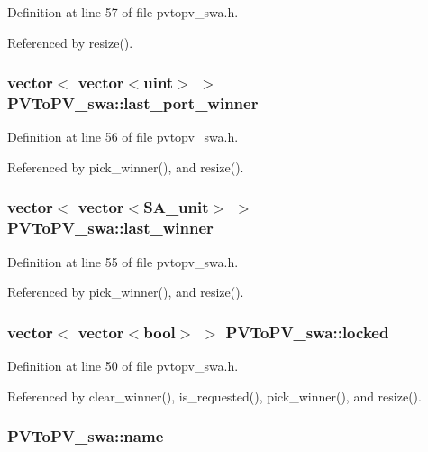 Definition at line 57 of file pvtopv\_\-swa.h.

Referenced by resize().
\subsubsection[{last\_\-port\_\-winner}]{\setlength{\rightskip}{0pt plus 5cm}vector$<$ vector$<${\bf uint}$>$ $>$ {\bf PVToPV\_\-swa::last\_\-port\_\-winner}\hspace{0.3cm}{\tt  [private]}}\label{classPVToPV__swa_2f3fb95289a05a774c01d99757c5033a}




Definition at line 56 of file pvtopv\_\-swa.h.

Referenced by pick\_\-winner(), and resize().
\subsubsection[{last\_\-winner}]{\setlength{\rightskip}{0pt plus 5cm}vector$<$ vector$<${\bf SA\_\-unit}$>$ $>$ {\bf PVToPV\_\-swa::last\_\-winner}\hspace{0.3cm}{\tt  [private]}}\label{classPVToPV__swa_b011bad00499395c558c299f64db6c8d}




Definition at line 55 of file pvtopv\_\-swa.h.

Referenced by pick\_\-winner(), and resize().
\subsubsection[{locked}]{\setlength{\rightskip}{0pt plus 5cm}vector$<$ vector$<$bool$>$ $>$ {\bf PVToPV\_\-swa::locked}\hspace{0.3cm}{\tt  [private]}}\label{classPVToPV__swa_ce112b708ff3e2b0fb45ae3758895357}




Definition at line 50 of file pvtopv\_\-swa.h.

Referenced by clear\_\-winner(), is\_\-requested(), pick\_\-winner(), and resize().
\subsubsection[{name}]{ {\bf PVToPV\_\-swa::name}}\label{classPVToPV__swa_9f673d0307d5d7b038138abcc78da074}




